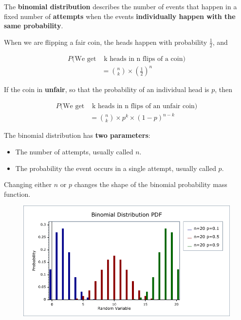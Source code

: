 %
\begin{frame}

The \textbf{binomial distribution} describes the number of events that happen in
a fixed number of \textbf{attempts} when the events \textbf{individually happen
with the same probability}.

\end{frame}
%

%
\begin{frame}
When we are flipping a fair coin, the heads happen with probability $\frac{1}{2}$, and

\begin{align*}
P(\text{We get} & \text{ k heads in n flips of a coin}) \\
%
&= {{n}\choose{k}} \times \left(\frac{1}{2} \right)^n
\end{align*}

\end{frame}
%

%
\begin{frame}
If the coin in \textbf{unfair}, so that the probability of an individual head is
$p$, then

\begin{align*}
P(\text{We get} & \text{ k heads in n flips of an unfair coin}) \\
%
&= {{n}\choose{k}} \times p^k \times (1 - p)^{n - k}
\end{align*}

\end{frame}
%

%
\begin{frame}
The binomial distribution has \textbf{two parameters}:

\begin{itemize}
\item The number of attempts, usually called $n$.
\item The probability the event occurs in a single attempt, usually called $p$.
\end{itemize}

\end{frame}
%

%
\begin{frame}
Changing either $n$ or $p$ changes the shape of the binomial probability mass
function.

  \begin{figure}
    \includegraphics[scale=0.50]{binomial-pdf-changing-p}
  \end{figure}

\end{frame}
%

